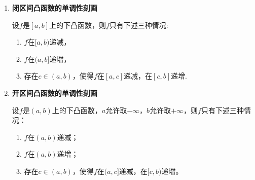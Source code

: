 \documentclass[../../main.tex]{subfiles}
\begin{document}
\begin{proposition}[下凸函数的单调性刻画]\label{proposition:下凸函数的单调性刻画}
\begin{enumerate}
\item \textbf{闭区间凸函数的单调性刻画}

设\(f\)是\([a,b]\)上的下凸函数，则\(f\)只有下述三种情况:
\begin{enumerate}[(1)]
\item \(f\)在\([a,b)\)递减，

\item \(f\)在\((a,b]\)递增，

\item 存在\(c\in(a,b)\)，使得\(f\)在\([a,c]\)递减，在\([c,b]\)递增.
\end{enumerate}

\item \textbf{开区间凸函数的单调性刻画}

设\(f\)是\((a,b)\)上的下凸函数，\(a\)允许取\(-\infty\)，\(b\)允许取\(+\infty\)，则\(f\)只有下述三种情况：
\begin{enumerate}[(1)]
\item \(f\)在\((a,b)\)递减；
\item \(f\)在\((a,b)\)递增；
\item 存在\(c\in(a,b)\)，使得\(f\)在\((a,c]\)递减，在\([c,b)\)递增。
\end{enumerate}
\end{enumerate}
\end{proposition}
\end{document}
